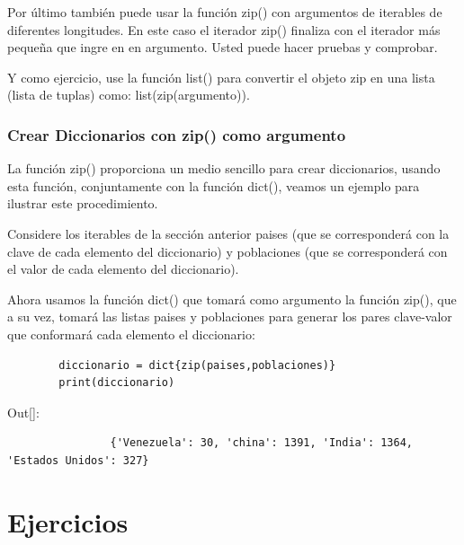 	
	Por último también puede usar la función {\ttfamily  zip()}  con argumentos de iterables de diferentes longitudes.
	En este caso  el iterador {\ttfamily  zip()} finaliza con el iterador  más pequeña que ingre en en argumento. Usted puede hacer pruebas y comprobar.
	
	
	Y como ejercicio,   use la función {\ttfamily list()} para convertir el objeto {\ttfamily zip} en una lista (lista de tuplas) como: {\ttfamily list(zip(argumento))}. \\ 
	
	
	
	\subsubsection{Crear Diccionarios con {\ttfamily zip()} como argumento} 
	
	La función {\ttfamily zip()}  proporciona un medio sencillo para crear diccionarios, usando esta función, conjuntamente con la función {\ttfamily dict()}, veamos un ejemplo para ilustrar este procedimiento. 
	
	Considere los iterables de la sección anterior {\ttfamily paises} (que se corresponderá con la clave de cada elemento del diccionario) y {\ttfamily poblaciones}    (que se corresponderá con el valor de cada elemento del diccionario). 
	
	Ahora usamos la función {\ttfamily dict()} que tomará como argumento la función {\ttfamily zip()}, que a su vez, tomará las listas {\ttfamily paises} y {\ttfamily  poblaciones}  para generar los pares clave-valor que conformará cada elemento el diccionario:
	
	
	
	
	\hspace{-2.5cm}{\ttfamily \scriptsize dicc\_zip.py}  \vspace{-0.5cm}
	\begin{lstlisting}
		diccionario = dict{zip(paises,poblaciones)}
		print(diccionario)
	\end{lstlisting}
	{\ttfamily\scriptsize\scriptsize \noindent Out[]: \vspace{-0.3cm}	
		{\color{blue} 	
			\begin{verbatim}
				{'Venezuela': 30, 'china': 1391, 'India': 1364, 'Estados Unidos': 327}
			\end{verbatim}
	}}
	
	
	\section{Ejercicios}     
	
